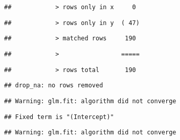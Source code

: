 \documentclass[
]{article}
\begin{document}
\begin{verbatim}
##            > rows only in x     0
\end{verbatim}

\begin{verbatim}
##            > rows only in y  ( 47)
\end{verbatim}

\begin{verbatim}
##            > matched rows     190
\end{verbatim}

\begin{verbatim}
##            >                 =====
\end{verbatim}

\begin{verbatim}
##            > rows total       190
\end{verbatim}

\begin{verbatim}
## drop_na: no rows removed
\end{verbatim}

\begin{verbatim}
## Warning: glm.fit: algorithm did not converge
\end{verbatim}

\begin{verbatim}
## Fixed term is "(Intercept)"
\end{verbatim}

\begin{verbatim}
## Warning: glm.fit: algorithm did not converge
\end{verbatim}
\end{document}
